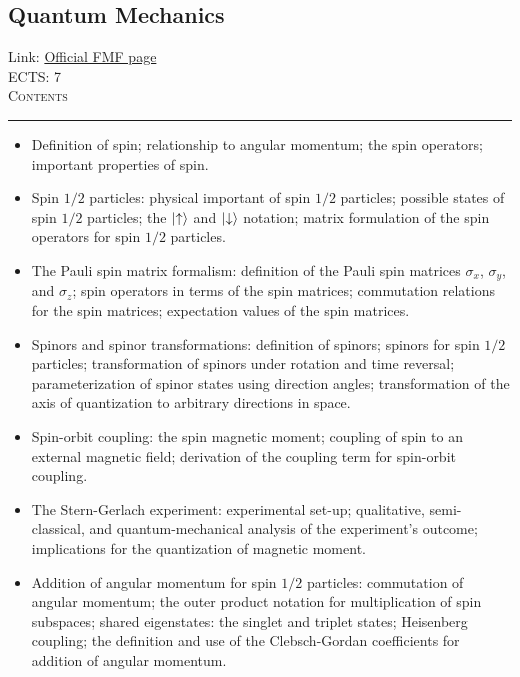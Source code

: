 \documentclass[11pt, a4paper]{article}
\newenvironment{course}[3]{
\subsection{#1}%
Link: \href{#2}{Official FMF page}\\%
ECTS: #3%
\vspace{1ex}
\\
{\large \textsc{Contents}}\\[-0.9ex]%
\rule{\textwidth}{0.5pt}
\vspace{-3ex}
}
{}
\newenvironment{chapter}[1]{
\begin{tcolorbox}[title=#1, breakable]
}
{\end{tcolorbox}}
\begin{document}
\begin{course}{Quantum Mechanics}{https://www.fmf.uni-lj.si/en/study-physics/programmes/1fiz/2020/7000777/courses/1156/}{7}
    \begin{chapter}{Spin}
        \begin{itemize}
        
            \item Definition of spin; relationship to angular momentum; the spin operators; important properties of spin.

            \item Spin $ 1/2 $ particles: physical important of spin $ 1/2 $ particles; possible states of spin $ 1/2 $ particles; the $ \ket{\uparrow} $ and $ \ket{\downarrow} $ notation; matrix formulation of the spin operators for spin $ 1/2 $ particles.

            \item The Pauli spin matrix formalism: definition of the Pauli spin matrices $ \sigma_{x} $, $ \sigma_{y} $, and $ \sigma_{z} $; spin operators in terms of the spin matrices; commutation relations for the spin matrices; expectation values of the spin matrices.

            \item Spinors and spinor transformations: definition of spinors; spinors for spin $ 1/2 $ particles; transformation of spinors under rotation and time reversal; parameterization of spinor states using direction angles; transformation of the axis of quantization to arbitrary directions in space.

            \item Spin-orbit coupling: the spin magnetic moment; coupling of spin to an external magnetic field; derivation of the coupling term for spin-orbit coupling.

            \item The Stern-Gerlach experiment: experimental set-up; qualitative, semi-classical, and quantum-mechanical analysis of the experiment's outcome; implications for the quantization of magnetic moment.

            \item Addition of angular momentum for spin $ 1/2 $ particles: commutation of angular momentum; the outer product notation for multiplication of spin subspaces; shared eigenstates: the singlet and triplet states; Heisenberg coupling; the definition and use of the Clebsch-Gordan coefficients for addition of angular momentum.
        
        \end{itemize}
    \end{chapter}

    \begin{chapter}{Perturbation and approximation theory}
        \begin{itemize}
        

\end{itemize}
\end{chapter}
\end{course}
\end{document}
